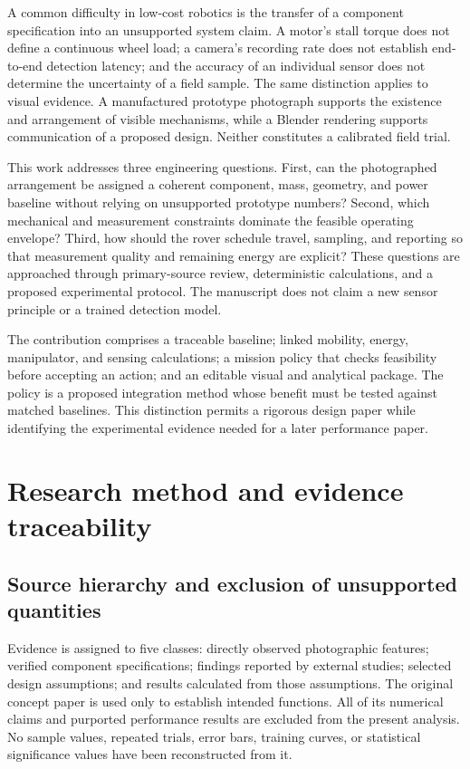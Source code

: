 \documentclass[11pt,letterpaper]{article}
\begin{document}
A common difficulty in low-cost robotics is the transfer of a component specification into an unsupported system claim. A motor's stall torque does not define a continuous wheel load; a camera's recording rate does not establish end-to-end detection latency; and the accuracy of an individual sensor does not determine the uncertainty of a field sample. The same distinction applies to visual evidence. A manufactured prototype photograph supports the existence and arrangement of visible mechanisms, while a Blender rendering supports communication of a proposed design. Neither constitutes a calibrated field trial.

This work addresses three engineering questions. First, can the photographed arrangement be assigned a coherent component, mass, geometry, and power baseline without relying on unsupported prototype numbers? Second, which mechanical and measurement constraints dominate the feasible operating envelope? Third, how should the rover schedule travel, sampling, and reporting so that measurement quality and remaining energy are explicit? These questions are approached through primary-source review, deterministic calculations, and a proposed experimental protocol. The manuscript does not claim a new sensor principle or a trained detection model.

The contribution comprises a traceable baseline; linked mobility, energy, manipulator, and sensing calculations; a mission policy that checks feasibility before accepting an action; and an editable visual and analytical package. The policy is a proposed integration method whose benefit must be tested against matched baselines. This distinction permits a rigorous design paper while identifying the experimental evidence needed for a later performance paper.

\FloatBarrier
\section{Research method and evidence traceability}

\subsection{Source hierarchy and exclusion of unsupported quantities}

Evidence is assigned to five classes: directly observed photographic features; verified component specifications; findings reported by external studies; selected design assumptions; and results calculated from those assumptions. The original concept paper is used only to establish intended functions. All of its numerical claims and purported performance results are excluded from the present analysis. No sample values, repeated trials, error bars, training curves, or statistical significance values have been reconstructed from it.
\end{document}
